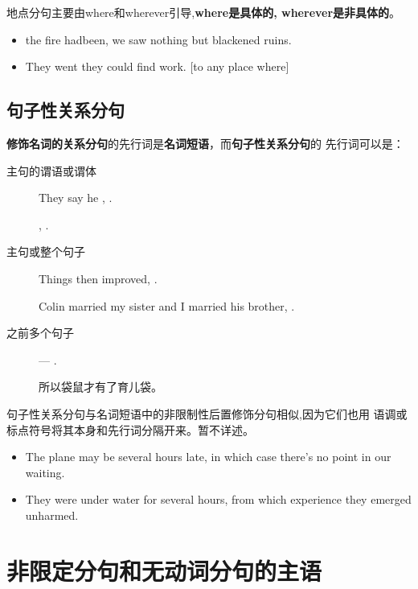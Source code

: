 地点分句主要由where和wherever引导,\textbf{where是具体的, wherever是非具体的}。
\begin{itemize}
\item {} the fire hadbeen, we saw nothing but blackened ruins.

\item They went  they could find work. [to any place where]
\end{itemize}

\subsection{句子性关系分句}

\textbf{修饰名词的关系分句}的先行词是\textbf{名词短语}，而\textbf{句子性关系分句}的
先行词可以是：
\begin{description}
\item[主句的谓语或谓体] They say he , .

  , .

\item[主句或整个句子] Things then improved, .

  Colin married my sister and I married his brother, .

\item[之前多个句子] --- .

  所以袋鼠才有了育儿袋。

\end{description}

句子性关系分句与名词短语中的非限制性后置修饰分句相似,因为它们也用
语调或标点符号将其本身和先行词分隔开来。暂不详述。
\begin{itemize}
\item The plane may be several hours late, in which case there's no point in our waiting.

\item They were under water for several hours, from which experience they
  emerged unharmed.
\end{itemize}


\section{非限定分句和无动词分句的主语}

